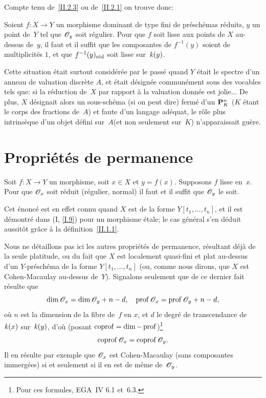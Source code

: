 Compte tenu de~\ref{II.2.3} ou de~\ref{II.2.1} on trouve donc:

\begin{corollaire}
\label{II.2.6}
Soient $f\colon X\to Y$ un morphisme dominant de type fini de
pr\'esch\'emas r\'eduits, $y$ un point de~$Y$ tel que
$\cal{O}_{y}$ soit r\'egulier. Pour que $f$ soit lisse aux points de
$X$ au-dessus de~$y$, il faut et il suffit que les composantes de
$f^{-1}(y)$ soient de multiplicit\'es $1$, et que $f^{-1}(y)_{\mathrm{r\acute{e}d}}$
soit lisse sur~$\mathit{k}(y)$.
\end{corollaire}

Cette situation \'etait surtout consid\'er\'ee par le pass\'e
quand $Y$ \'etait le spectre d'un anneau de valuation discr\`ete
$A$, et \'etait d\'esign\'ee commun\'ement sous des vocables
tels que: \og si la r\'eduction de~$X$ par rapport \`a la valuation
donn\'ee est jolie\fg... De plus, $X$ d\'esignait alors un
sous-sch\'ema (si on peut dire) ferm\'e d'un $\mathbf{P}_{K}^{n}$ ($K$
\'etant le corps des fractions de~$A$) et faute d'un
langage
ad\'equat, le r\^ole plus intrins\`eque d'un objet \og d\'efini
sur~$A$\fg (et non seulement sur~$K$) n'apparaissait gu\`ere.

\section{Propri\'et\'es de permanence}
\label{II.3}

\begin{proposition}
\label{II.3.1}
Soit $f\colon X\to Y$ un morphisme, soit $x\in X$ et
$y=f(x)$. Supposons $f$ lisse en~$x$. Pour que $\cal{O}_{x}$ soit
r\'eduit (\resp r\'egulier, \resp normal) il faut et il suffit que
$\cal{O}_{y}$ le soit.
\end{proposition}

Cet \'enonc\'e est en effet connu quand $X$ est de la forme
$Y[t_{1},\dots,t_{n}]$, et il est d\'emontr\'e dans (I, \no \ref{I.9})
pour un morphisme \'etale; le cas g\'en\'eral s'en d\'eduit
aussit\^ot gr\^ace \`a la d\'efinition~\ref{II.1.1}.

Nous ne d\'etaillons pas ici les autres propri\'et\'es de
permanence, r\'esultant d\'ej\`a de la seule platitude, ou du
fait que $X$ est localement quasi-fini et plat au-dessus d'un
$Y$-pr\'esch\'ema de la forme $Y[t_{1},\dots,t_{n}]$ (ou, comme
nous dirons, que $X$ est
Cohen-Macaulay
au-dessus de~$Y$). Signalons seulement que de ce dernier fait
r\'esulte que
\begin{equation}
\label{eq:II.3.1}
{\dim\cal{O}_{x}=\dim\cal{O}_{y}+n-d,\quad
\prof\cal{O}_{x}=\prof\cal{O}_{y}+n-d},
\end{equation}
o\`u $n$ est la dimension de la fibre de~$f$ en $x$, et $d$ le
degr\'e de transcendance de~$\mathit{k}(x)$ sur~$\mathit{k}(y)$, d'o\`u (posant
$\operatorname{coprof}=\dim-\operatorname{prof}$)\footnote{Pour ces formules, \cf EGA~IV 6.1
et~6.3.}
\begin{equation}
\label{eq:II.3.2}
{\coprof\cal{O}_{x}=\coprof\cal{O}_{y}}.
\end{equation}
Il en r\'esulte par exemple que $\cal{O}_{x}$ est Cohen-Macaulay
(\resp sans composantes immerg\'ees) si et seulement si il en est de
m\^eme de~$\cal{O}_{y}$.

